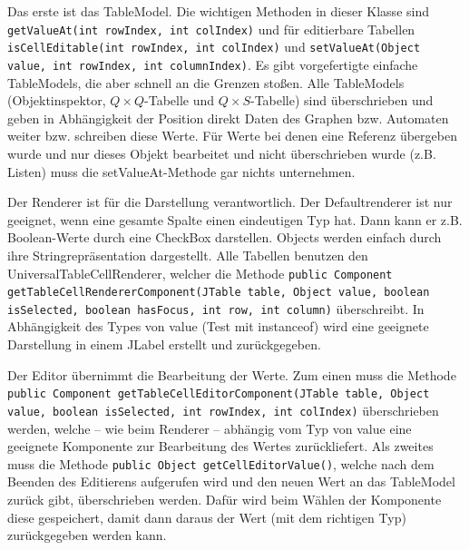 Das erste ist das TableModel. Die wichtigen Methoden in dieser Klasse sind \lstinline[breaklines=true]{getValueAt(int rowIndex, int colIndex)} und für editierbare Tabellen \lstinline[breaklines=true]{isCellEditable(int rowIndex, int colIndex)} und \lstinline[breaklines=true]{setValueAt(Object value, int rowIndex, int columnIndex)}. Es gibt vorgefertigte einfache TableModels, die aber schnell an die Grenzen stoßen. Alle Table\-Mo\-dels (Objektinspektor, $Q \times Q$-Tabelle und $Q \times S$-Tabelle) sind überschrieben und geben in Abhängigkeit der Position direkt Daten des Graphen bzw. Automaten weiter bzw. schreiben diese Werte. Für Werte bei denen eine Referenz übergeben wurde und nur dieses Objekt bearbeitet und nicht überschrieben wurde (z.B. Listen) muss die setValueAt-Methode gar nichts unternehmen.

Der Renderer ist für die Darstellung verantwortlich. Der Defaultrenderer ist nur geeignet, wenn eine gesamte Spalte einen eindeutigen Typ hat. Dann kann er z.B. Boolean-Werte durch eine CheckBox darstellen. Objects werden einfach durch ihre Stringrepräsentation dargestellt. Alle Tabellen benutzen den UniversalTableCellRenderer, welcher die Methode \lstinline{public Component getTableCellRendererComponent(JTable table, Object value, boolean isSelected, boolean hasFocus, int row, int column)} überschreibt. In Abhängigkeit des Types von value (Test mit instanceof) wird eine geeignete Darstellung in einem JLabel erstellt und zurückgegeben.

Der Editor übernimmt die Bearbeitung der Werte. Zum einen muss die Methode \lstinline{public Component getTableCellEditorComponent(JTable table, Object value, boolean isSelected, int rowIndex, int colIndex)} überschrieben werden, welche -- wie beim Renderer -- abhängig vom Typ von value eine geeignete Komponente zur Bearbeitung des Wertes zurückliefert. Als zweites muss die Methode \lstinline{public Object getCellEditorValue()}, welche nach dem Beenden des Editierens aufgerufen wird und den neuen Wert an das TableModel zurück gibt, überschrieben werden. Dafür wird beim Wählen der Komponente diese gespeichert, damit dann daraus der Wert (mit dem richtigen Typ) zurückgegeben werden kann.

